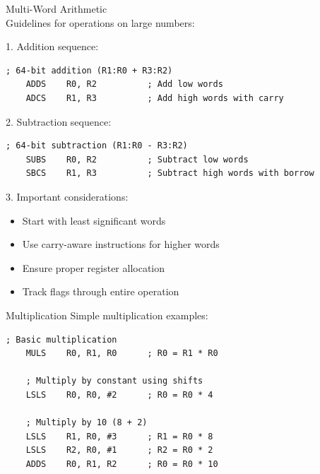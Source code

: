 \begin{KR}{Multi-Word Arithmetic}\\
Guidelines for operations on large numbers:

1. Addition sequence:
\begin{lstlisting}[language=armasm, style=base]
    ; 64-bit addition (R1:R0 + R3:R2)
    ADDS    R0, R2          ; Add low words
    ADCS    R1, R3          ; Add high words with carry
\end{lstlisting}

2. Subtraction sequence:
\begin{lstlisting}[language=armasm, style=base]
    ; 64-bit subtraction (R1:R0 - R3:R2)
    SUBS    R0, R2          ; Subtract low words
    SBCS    R1, R3          ; Subtract high words with borrow
\end{lstlisting}

3. Important considerations:
\begin{itemize}
  \item Start with least significant words
  \item Use carry-aware instructions for higher words
  \item Ensure proper register allocation
  \item Track flags through entire operation
\end{itemize}
\end{KR}

\begin{example2}{Multiplication}
Simple multiplication examples:
\begin{lstlisting}[language=armasm, style=base]
    ; Basic multiplication
    MULS    R0, R1, R0      ; R0 = R1 * R0
    
    ; Multiply by constant using shifts
    LSLS    R0, R0, #2      ; R0 = R0 * 4
    
    ; Multiply by 10 (8 + 2)
    LSLS    R1, R0, #3      ; R1 = R0 * 8
    LSLS    R2, R0, #1      ; R2 = R0 * 2
    ADDS    R0, R1, R2      ; R0 = R0 * 10
\end{lstlisting}
\end{example2}
